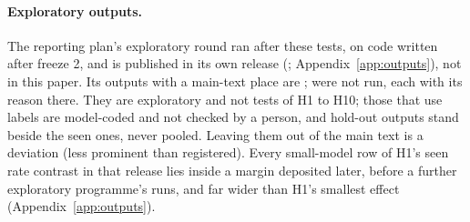 \paragraph{Exploratory outputs.} The reporting plan's exploratory round ran after these tests, on code written after
freeze 2, and is published in its own release (\ExpRelease; Appendix~\ref{app:outputs}), not in this paper. Its outputs
with a main-text place are \ExpMainReported; \ExpMainNotRun{} were not run, each with its reason there. They are
exploratory and not tests of H1 to H10; those that use labels are model-coded and not checked by a person, and hold-out
outputs stand beside the seen ones, never pooled. Leaving them out of the main text is a deviation (less prominent than
registered). Every small-model row of H1's seen rate contrast in that release lies inside a margin deposited
later, before a further exploratory programme's runs, and far wider than H1's smallest effect (Appendix~\ref{app:outputs}).
